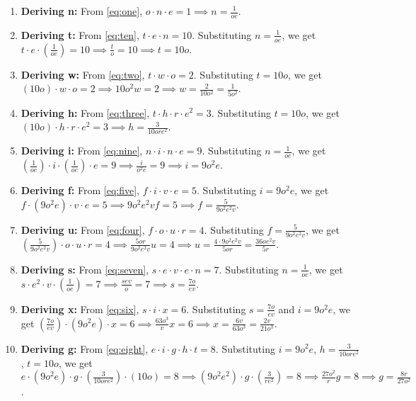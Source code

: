 \documentclass[12pt,a4paper]{article}
\theoremstyle{plain}
\theoremstyle{definition}
\begin{document}
\begin{enumerate}
    \item \textbf{Deriving n:} From \eqref{eq:one}, $o \cdot n \cdot e = 1 \implies n = \frac{1}{oe}$.
    \item \textbf{Deriving t:} From \eqref{eq:ten}, $t \cdot e \cdot n = 10$. Substituting $n = \frac{1}{oe}$, we get $t \cdot e \cdot (\frac{1}{oe}) = 10 \implies \frac{t}{o} = 10 \implies t = 10o$.
    \item \textbf{Deriving w:} From \eqref{eq:two}, $t \cdot w \cdot o = 2$. Substituting $t = 10o$, we get $(10o) \cdot w \cdot o = 2 \implies 10o^2 w = 2 \implies w = \frac{2}{10o^2} = \frac{1}{5o^2}$.
    \item \textbf{Deriving h:} From \eqref{eq:three}, $t \cdot h \cdot r \cdot e^2 = 3$. Substituting $t = 10o$, we get $(10o) \cdot h \cdot r \cdot e^2 = 3 \implies h = \frac{3}{10ore^2}$.
    \item \textbf{Deriving i:} From \eqref{eq:nine}, $n \cdot i \cdot n \cdot e = 9$. Substituting $n = \frac{1}{oe}$, we get $(\frac{1}{oe}) \cdot i \cdot (\frac{1}{oe}) \cdot e = 9 \implies \frac{i}{o^2e} = 9 \implies i = 9o^2e$.
    \item \textbf{Deriving f:} From \eqref{eq:five}, $f \cdot i \cdot v \cdot e = 5$. Substituting $i = 9o^2e$, we get $f \cdot (9o^2e) \cdot v \cdot e = 5 \implies 9o^2e^2v f = 5 \implies f = \frac{5}{9o^2e^2v}$.
    \item \textbf{Deriving u:} From \eqref{eq:four}, $f \cdot o \cdot u \cdot r = 4$. Substituting $f = \frac{5}{9o^2e^2v}$, we get $(\frac{5}{9o^2e^2v}) \cdot o \cdot u \cdot r = 4 \implies \frac{5or}{9o^2e^2v} u = 4 \implies u = \frac{4 \cdot 9o^2e^2v}{5or} = \frac{36oe^2v}{5r}$.
    \item \textbf{Deriving s:} From \eqref{eq:seven}, $s \cdot e \cdot v \cdot e \cdot n = 7$. Substituting $n = \frac{1}{oe}$, we get $s \cdot e^2 \cdot v \cdot (\frac{1}{oe}) = 7 \implies \frac{sev}{o} = 7 \implies s = \frac{7o}{ev}$.
    \item \textbf{Deriving x:} From \eqref{eq:six}, $s \cdot i \cdot x = 6$. Substituting $s = \frac{7o}{ev}$ and $i = 9o^2e$, we get $(\frac{7o}{ev}) \cdot (9o^2e) \cdot x = 6 \implies \frac{63o^3}{v} x = 6 \implies x = \frac{6v}{63o^3} = \frac{2v}{21o^3}$.
    \item \textbf{Deriving g:} From \eqref{eq:eight}, $e \cdot i \cdot g \cdot h \cdot t = 8$. Substituting $i=9o^2e$, $h=\frac{3}{10ore^2}$, $t=10o$, we get $e \cdot (9o^2e) \cdot g \cdot (\frac{3}{10ore^2}) \cdot (10o) = 8 \implies (9o^2e^2) \cdot g \cdot (\frac{3}{re^2}) = 8 \implies \frac{27o^2}{r} g = 8 \implies g = \frac{8r}{27o^2}$.

\end{enumerate}
\end{document}
